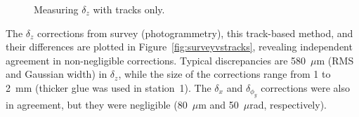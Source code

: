 \begin{figure}
  \begin{center}
  \end{center}
  \caption{Measuring $\delta_z$ with tracks only. \label{fig:extrapolation}}
\end{figure}

The $\delta_z$ corrections from survey (photogrammetry), this
track-based method, and their differences are plotted in
Figure~\ref{fig:surveyvstracks}, revealing independent agreement in
non-negligible corrections.  Typical discrepancies are 580~$\mu$m (RMS
and Gaussian width) in $\delta_z$, while the size of the corrections
range from 1 to 2~mm (thicker glue was used in station~1).  The
$\delta_x$ and $\delta_{\phi_y}$ corrections were also in agreement,
but they were negligible (80~$\mu$m and 50~$\mu$rad, respectively).

